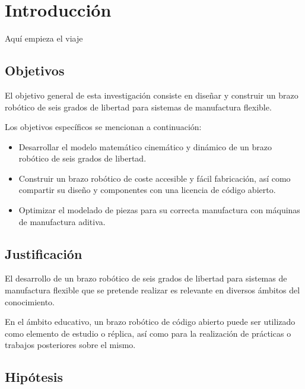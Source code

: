 \chapter{Introducción}

Aquí empieza el viaje	

\section{Objetivos}

El objetivo general de esta investigación consiste en diseñar y construir un brazo robótico de seis grados de libertad para sistemas de manufactura flexible.

Los objetivos específicos se mencionan a continuación:

\begin{itemize}
\item Desarrollar el modelo matemático cinemático y dinámico de un brazo robótico de seis grados de libertad.
\item Construir un brazo robótico de coste accesible y fácil fabricación, así como compartir su diseño y componentes con una licencia de código abierto. 
\item Optimizar el modelado de piezas para su correcta manufactura con máquinas de manufactura aditiva.
\end{itemize}

\section{Justificación}

El desarrollo de un brazo robótico de seis grados de libertad para sistemas de manufactura flexible que se pretende realizar es relevante en diversos ámbitos del conocimiento. 

\begin{comment}
De acuerdo con Spong et al. \cite[p.~1]{Spong2005}, la mayoría de las aplicaciones de la robótica se centran en brazos robóticos industriales que operan en fabricas con entornos estructurados, sin embargo, a medida que la competencia en la industria se vuelve más intensa, se vuelve necesaria una nueva estrategia de manufactura, llamada sistema de manufactura flexible, en
\end{comment}

En el ámbito educativo, un brazo robótico de código abierto puede ser utilizado como elemento de estudio o réplica, así como para la realización de prácticas o trabajos posteriores sobre el mismo.



\section{Hipótesis}

